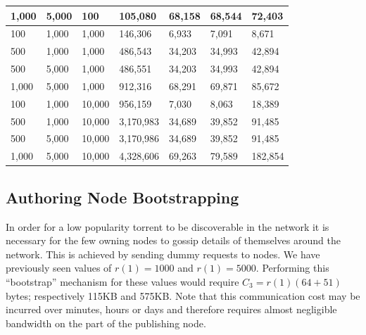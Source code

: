 \begin{table}
\begin{tabular}{l|l|l|l|l|l|l}
            1,000 &                  5,000 &          100 &       105,080 &       68,158 &       68,544 &            72,403 \\ \hline
              100 &                  1,000 &        1,000 &       146,306 &        6,933 &        7,091 &             8,671 \\
              500 &                  1,000 &        1,000 &       486,543 &       34,203 &       34,993 &            42,894 \\
              500 &                  5,000 &        1,000 &       486,551 &       34,203 &       34,993 &            42,894 \\
            1,000 &                  5,000 &        1,000 &       912,316 &       68,291 &       69,871 &            85,672 \\ \hline
              100 &                  1,000 &       10,000 &       956,159 &        7,030 &        8,063 &            18,389 \\
              500 &                  1,000 &       10,000 &     3,170,983 &       34,689 &       39,852 &            91,485 \\
              500 &                  5,000 &       10,000 &     3,170,986 &       34,689 &       39,852 &            91,485 \\
            1,000 &                  5,000 &       10,000 &     4,328,606 &       69,263 &       79,589 &           182,854 \\
            \hline
        \end{tabular}
    \end{table}

\subsection{Authoring Node Bootstrapping}

    In order for a low popularity torrent to be discoverable in the network it is necessary for the few owning nodes to gossip details of themselves around the network. This is achieved by sending dummy requests to nodes. We have previously seen values of $r(1)=1000$ and $r(1)=5000$. Performing this ``bootstrap'' mechanism for these values would require $C_3=r(1)(64+51)$ bytes; respectively 115KB and 575KB. Note that this communication cost may be incurred over minutes, hours or days and therefore requires almost negligible bandwidth on the part of the publishing node.

